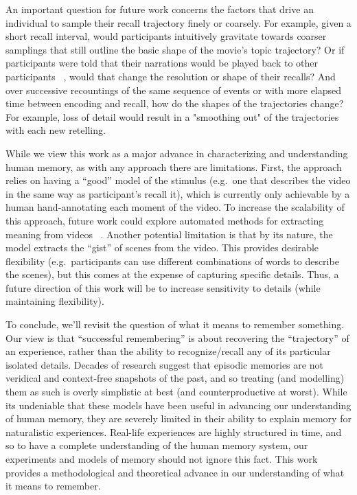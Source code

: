 \documentclass{article}
\begin{document}
An important question for future work concerns the factors that drive an individual to sample their recall trajectory finely or coarsely. For example, given a short recall interval, would participants intuitively gravitate towards coarser samplings that still outline the basic shape of the movie's topic trajectory? Or if participants were told that their narrations would be played back to other participants ~\citep{ZadbEtal17}, would that change the resolution or shape of their recalls? And over successive recountings of the same sequence of events or with more elapsed time between encoding and recall, how do the shapes of the trajectories change? For example, loss of detail would result in a "smoothing out" of the trajectories with each new retelling.

While we view this work as a major advance in characterizing and understanding human memory, as with any approach there are limitations. First, the approach relies on having a ``good'' model of the stimulus (e.g.\ one that describes the video in the same way as participant's recall it), which is currently only achievable by a human hand-annotating each moment of the video.  To increase the scalability of this approach, future work could explore automated methods for extracting meaning from videos ~\citep{YuEtal16}.  Another potential limitation is that by its nature, the model extracts the ``gist'' of scenes from the video.  This provides desirable flexibility (e.g.\ participants can use different combinations of words to describe the scenes), but this comes at the expense of capturing specific details.  Thus, a future direction of this work will be to increase sensitivity to details (while maintaining flexibility).

To conclude, we'll revisit the question of what it means to remember something. Our view is that ``successful remembering'' is about recovering the ``trajectory'' of an experience, rather than the ability to recognize/recall any of its particular isolated details. Decades of research suggest that episodic memories are not veridical and context-free snapshots of the past, and so treating (and modelling) them as such is overly simplistic at best (and counterproductive at worst). While its undeniable that these models have been useful in advancing our understanding of human memory, they are severely limited in their ability to explain memory for naturalistic experiences. Real-life experiences are highly structured in time, and so to have a complete understanding of the human memory system, our experiments and models of memory should not ignore this fact. This work provides a methodological and theoretical advance in our understanding of what it means to remember.
\end{document}
